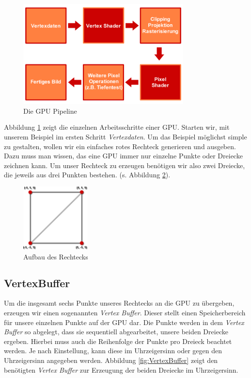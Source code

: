 \begin{Spacing}{\mylinespace}
\begin{figure}[h!]
	\vspace*{20px}
	\centering
	\includegraphics[width=330px]{graphics/pipeline.png}	
	\caption{Die GPU Pipeline}
	\label{fig:pipeline}
\end{figure}

Abbildung \ref{fig:pipeline} zeigt die einzelnen Arbeitsschritte einer GPU. Starten wir, mit unserem Beispiel im ersten Schritt \textit{Vertexdaten}. Um das Beispiel möglichst simple zu gestalten, wollen wir ein einfaches rotes Rechteck generieren und ausgeben. Dazu muss man wissen, das eine GPU immer nur einzelne Punkte oder Dreiecke zeichnen kann. Um unser Rechteck zu erzeugen benötigen wir also zwei Dreiecke, die jeweils aus drei Punkten bestehen. (s. Abbildung \ref{fig:Viereck}).

\begin{figure}[h!]
	\vspace*{30px}
	\centering
	\includegraphics[height=130px]{graphics/Quad2.png}	
	\caption{Aufbau des Rechtecks}
	\label{fig:Viereck}
\end{figure}

\subsection{VertexBuffer}
Um die insgesamt sechs Punkte unseres Rechtecks an die GPU zu übergeben, erzeugen wir einen sogenannten \textit{Vertex Buffer}. Dieser stellt einen Speicherbereich für unsere einzelnen Punkte auf der GPU dar. Die Punkte werden in dem \textit{Vertex Buffer} so abgelegt, dass sie sequentiell abgearbeitet, unsere beiden Dreiecke ergeben. Hierbei muss auch die Reihenfolge der Punkte pro Dreieck beachtet werden. Je nach Einstellung, kann diese im Uhrzeigersinn oder gegen den Uhrzeigersinn angegeben werden. Abbildung \ref{fig:VertexBuffer} zeigt den benötigten \textit{Vertex Buffer} zur Erzeugung der beiden Dreiecke im Uhrzeigersinn.


\end{Spacing}
